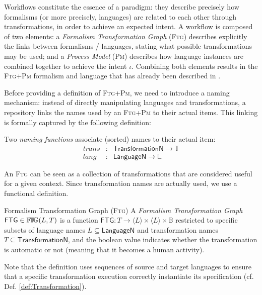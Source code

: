 Workflows constitute the essence of a paradigm: they describe precisely how 
formalisms (or more precisely, languages) are related to each other through 
transformations, in order to achieve an expected intent. 
A workflow is composed of two elements: a \emph{Formalism Transformation Graph} 
(\textsc{Ftg}) describes explicitly the links between formalisms / languages, 
stating what possible transformations may be used; and a \emph{Process Model} 
(\textsc{Pm}) describes how language instances are 
combined together to achieve the intent $\iota$. Combining both elements 
results in the \textsc{Ftg+Pm} formalism and language that has already been 
described in \cite{}.

Before providing a definition of \textsc{Ftg+Pm}, we need to introduce a naming 
mechanism: instead of directly manipulating languages and transformations, a 
repository links the names used by an \textsc{Ftg+Pm} to their actual items. 
This linking is formally captured by the following definition:



\begin{Definition}[Naming]
   Two \emph{naming functions} associate (sorted) names to their actual item:
   \begin{displaymath}
      \begin{array}{rcl}
         trans &\colon& \mathsf{TransformationN} \to \mathbb{T}\\
         lang  &\colon& \mathsf{LanguageN} \to \mathbb{L}
      \end{array}
   \end{displaymath}
\end{Definition}

An \textsc{Ftg} can be seen as a collection of transformations that are 
considered useful for a given context. Since transformation names are actually 
used, we use a functional definition.
\begin{Definition}{Formalism Transformation Graph (\textsc{Ftg})}
   A \emph{Formalism Transformation Graph} $\mathsf{FTG} \in \mathbb{F}\!\mathbb{T}\!\mathbb{G}(L, T)$ is a 
function  $\mathsf{FTG} \colon T \to \langle L \rangle \times \langle L \rangle 
\times \mathbb{B}$ restricted to specific subsets of language names $L 
\subseteq \mathsf{LanguageN}$ and transformation names $T\subseteq 
\mathsf{TransformationN}$, and the boolean value indicates whether the 
transformation is automatic or not (meaning that it becomes a human activity).
\end{Definition}
Note that the definition uses sequences of source and target languages to 
ensure that a specific transformation execution correctly instantiate its 
specification (cf. Def. \ref{def:Transformation}).

